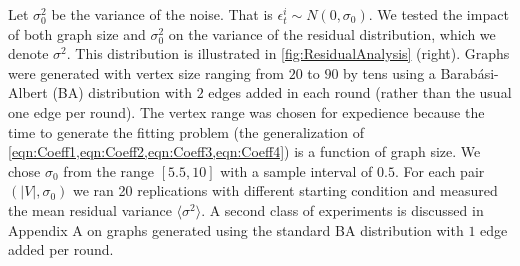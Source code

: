 \documentclass[aps,superscriptaddress,floatfix,amsmath,amssymb]{revtex4-2}
\begin{document}
Let $\sigma_0^2$ be the variance of the noise. That is $\epsilon^i_t \sim N(0,\sigma_0)$. We tested the impact of both graph size and $\sigma_0^2$ on the variance of the residual distribution, which we denote $\sigma^2$. This distribution is illustrated in \cref{fig:ResidualAnalysis} (right). Graphs were generated with vertex size ranging from $20$ to $90$ by tens using a Barab\'{a}si-Albert (BA) distribution \cite{BA99a} with $2$ edges added in each round (rather than the usual one edge per round). The vertex range was chosen for expedience because the time to generate the fitting problem (the generalization of \cref{eqn:Coeff1,eqn:Coeff2,eqn:Coeff3,eqn:Coeff4}) is a function of graph size. We chose $\sigma_0$ from the range $[5.5,10]$ with a sample interval of $0.5$. For each pair $(|V|, \sigma_0)$ we ran 20 replications with different starting condition and measured the mean residual variance $\langle{\sigma^2}\rangle$. A second class of experiments is discussed in Appendix A on graphs generated using the standard BA distribution with $1$ edge added per round.
\end{document}
